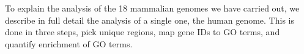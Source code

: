 To explain the analysis of the 18 mammalian genomes we have carried
out, we describe in full detail the analysis of a single one, the
human genome. This is done in three steps, pick unique regions, map
gene IDs to GO terms, and quantify enrichment of GO terms.
